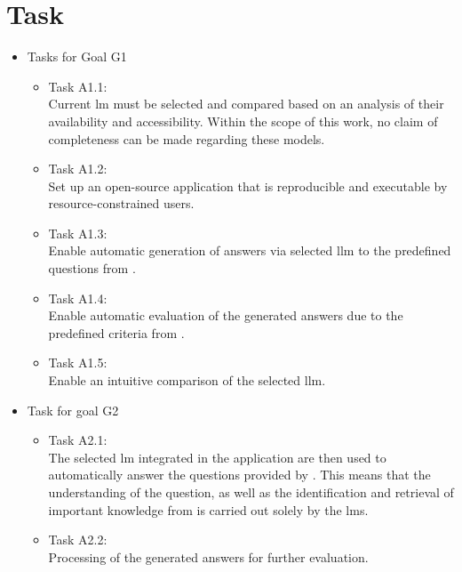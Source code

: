\section{Task}
\begin{itemize}
  \item Tasks for Goal G1
        \begin{itemize}
          \item Task A1.1:\label{task:1_1_llm_comparison}\\
            Current \ac{lm} must be selected and compared based on an analysis of their availability and accessibility.
            Within the scope of this work, no claim of completeness can be made regarding these models.
          \item Task A1.2:\label{task:1_2_reproducible}\\
            Set up an open-source application that is reproducible and executable by resource-constrained users.
          \item Task A1.3:\label{task:1_3_answer_generation_llm}\\
            Enable automatic generation of answers via selected \ac{llm} to the predefined questions from \citet{Paul_Keller}.  
          \item Task A1.4:\label{task:1_4_automatic_eval}\\
            Enable automatic evaluation of the generated answers due to the predefined criteria from \citet{Paul_Keller}.
          \item Task A1.5:\label{task:1_5_intuitive_comparison}\\
            Enable an intuitive comparison of the selected \ac{llm}.
        \end{itemize}
  \item Task for goal G2
        \begin{itemize}
            \item Task A2.1:\label{task:2_1_auto_generate}\\
            The selected \ac{lm} integrated in the application are then used to automatically answer the questions provided by \citet{Paul_Keller}.
            This means that the understanding of the question, as well as the identification and retrieval of important knowledge from \citet{bb2} is carried out solely by the \acp{lm}.
            \item Task A2.2:\label{task:2_2_processing}\\
            Processing of the generated answers for further evaluation.

\end{itemize}
\end{itemize}
